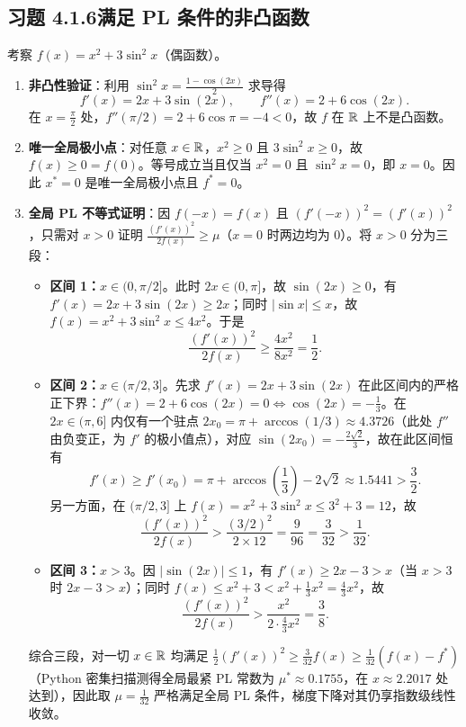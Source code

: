 \subsection*{习题 4.1.6\quad 满足 PL 条件的非凸函数}
考察 $f(x) = x^2 + 3\sin^2 x$（偶函数）。
\begin{enumerate}[label=(\alph*), leftmargin=1.8em]
  \item \textbf{非凸性验证}：利用 $\sin^2 x = \frac{1 - \cos(2x)}{2}$ 求导得
  \[
    f'(x) = 2x + 3\sin(2x), \qquad f''(x) = 2 + 6\cos(2x).
  \]
  在 $x = \frac{\pi}{2}$ 处，$f''(\pi/2) = 2 + 6\cos\pi = -4 < 0$，故 $f$ 在 $\mathbb{R}$ 上不是凸函数。

  \item \textbf{唯一全局极小点}：对任意 $x \in \mathbb{R}$，$x^2 \ge 0$ 且 $3\sin^2 x \ge 0$，故 $f(x) \ge 0 = f(0)$。等号成立当且仅当 $x^2 = 0$ 且 $\sin^2 x = 0$，即 $x = 0$。因此 $x^* = 0$ 是唯一全局极小点且 $f^* = 0$。

  \item \textbf{全局 PL 不等式证明}：因 $f(-x) = f(x)$ 且 $(f'(-x))^2 = (f'(x))^2$，只需对 $x > 0$ 证明 $\frac{(f'(x))^2}{2f(x)} \ge \mu$（$x = 0$ 时两边均为 $0$）。将 $x > 0$ 分为三段：
  \begin{itemize}
    \item \textbf{区间 1：$x \in (0, \pi/2]$}。此时 $2x \in (0, \pi]$，故 $\sin(2x) \ge 0$，有 $f'(x) = 2x + 3\sin(2x) \ge 2x$；同时 $|\sin x| \le x$，故 $f(x) = x^2 + 3\sin^2 x \le 4x^2$。于是
    \[
      \frac{(f'(x))^2}{2f(x)} \ge \frac{4x^2}{8x^2} = \frac{1}{2}.
    \]
    \item \textbf{区间 2：$x \in (\pi/2, 3]$}。先求 $f'(x) = 2x + 3\sin(2x)$ 在此区间内的严格正下界：$f''(x) = 2 + 6\cos(2x) = 0 \iff \cos(2x) = -\frac{1}{3}$。在 $2x \in (\pi, 6]$ 内仅有一个驻点 $2x_0 = \pi + \arccos(1/3) \approx 4.3726$（此处 $f''$ 由负变正，为 $f'$ 的极小值点），对应 $\sin(2x_0) = -\frac{2\sqrt{2}}{3}$，故在此区间恒有
    \[
      f'(x) \ge f'(x_0) = \pi + \arccos\!\left(\frac{1}{3}\right) - 2\sqrt{2} \approx 1.5441 > \frac{3}{2}.
    \]
    另一方面，在 $(\pi/2, 3]$ 上 $f(x) = x^2 + 3\sin^2 x \le 3^2 + 3 = 12$，故
    \[
      \frac{(f'(x))^2}{2f(x)} > \frac{(3/2)^2}{2 \times 12} = \frac{9}{96} = \frac{3}{32} > \frac{1}{32}.
    \]
    \item \textbf{区间 3：$x > 3$}。因 $|\sin(2x)| \le 1$，有 $f'(x) \ge 2x - 3 > x$（当 $x > 3$ 时 $2x - 3 > x$）；同时 $f(x) \le x^2 + 3 < x^2 + \frac{1}{3}x^2 = \frac{4}{3}x^2$，故
    \[
      \frac{(f'(x))^2}{2f(x)} > \frac{x^2}{2 \cdot \frac{4}{3}x^2} = \frac{3}{8}.
    \]
  \end{itemize}
  综合三段，对一切 $x \in \mathbb{R}$ 均满足 $\frac{1}{2}(f'(x))^2 \ge \frac{3}{32} f(x) \ge \frac{1}{32}(f(x) - f^*)$（Python 密集扫描测得全局最紧 PL 常数为 $\mu^* \approx 0.1755$，在 $x \approx 2.2017$ 处达到），因此取 $\mu = \frac{1}{32}$ 严格满足全局 PL 条件，梯度下降对其仍享指数级线性收敛。
\end{enumerate}

